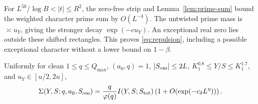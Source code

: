 For \(L^{50}/\log B<|t|\le R^2\), the zero-free strip and
Lemma~\ref{lem:prime-sum} bound the weighted character prime sum by
\(O(L^{-4})\).  The untwisted prime mass is \(\asymp u_Y\), giving
the stronger decay \(\exp(-cu_Y)\).  An exceptional real zero lies
outside these shifted rectangles.  This proves
\eqref{eq:repulsion}, including a possible exceptional character
without a lower bound on \(1-\beta\).

\begin{proposition}\label{prop:progressions}
Uniformly for clean \(1\le q\le Q_{\max}\), \((a_0,q)=1\),
\(|S_{\rm om}|\le2L\), \(K_1^{0.8}\le Y/S\le K_1^{1.7}\), and
\(u_Y\in[u/2,2u]\),
\begin{equation}\label{eq:clean-asymptotic}
 \Sigma(Y,S;q,a_0,S_{\rm om})
 =\frac q{\varphi(q)}I(Y,S;S_{\rm tot})
       \left(1+O(\exp(-c_\delta L^\eta))\right).
\end{equation}
\end{proposition}

